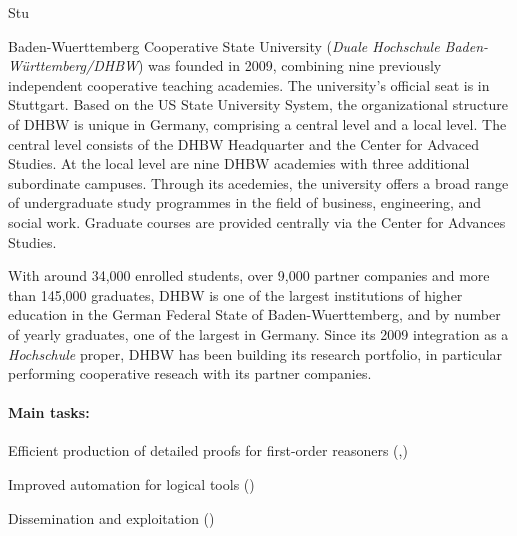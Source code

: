 \begin{sitedescription}{Stu}


Baden-Wuerttemberg Cooperative State University (\emph{Duale
  Hochschule Baden-Württemberg/DHBW}) was founded in 2009, combining
nine previously independent cooperative teaching academies. The
university's official seat is in Stuttgart. Based on the US State
University System, the organizational structure of DHBW is unique in
Germany, comprising a central level and a local level. The central
level consists of the DHBW Headquarter and the Center for Advaced
Studies. At the local level are nine DHBW academies with three
additional subordinate campuses. Through its acedemies, the university
offers a broad range of undergraduate study programmes in the field of
business, engineering, and social work. Graduate courses are provided
centrally via the Center for Advances Studies.


With around 34,000 enrolled students, over 9,000 partner companies and
more than 145,000 graduates, DHBW is one of the largest institutions
of higher education in the German Federal State of Baden-Wuerttemberg,
and by number of yearly graduates, one of the largest in Germany.
Since its 2009 integration as a \emph{Hochschule} proper, DHBW has
been building its research portfolio, in particular performing
cooperative reseach with its partner companies.


\paragraph*{Main tasks:}

\begin{compactitem}
\item Efficient production of detailed proofs for first-order
  reasoners (,)
\item Improved automation for logical tools ()
\item Dissemination and exploitation ()
\end{compactitem}


\end{sitedescription}
